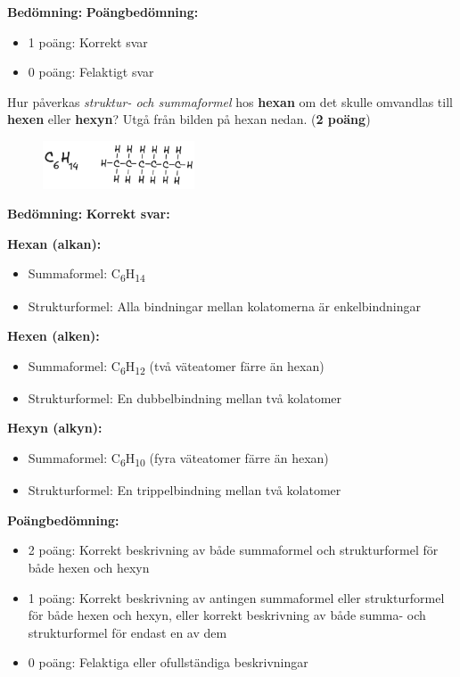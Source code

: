 \documentclass[12pt]{exam}
\newenvironment{answer}
  {\begin{framed}\color{blue}\textbf{Bedömning:} }
  {\end{framed}}
\begin{document}
\begin{questions}
\begin{answer}
\textbf{Poängbedömning:}
\begin{itemize}
  \item 1 poäng: Korrekt svar
  \item 0 poäng: Felaktigt svar
\end{itemize}
\end{answer}
\vspace{5mm}

\question Hur påverkas \textit{struktur- och summaformel} hos \textbf{hexan} om det skulle omvandlas till \textbf{hexen} eller \textbf{hexyn}? Utgå från bilden på hexan nedan. (\textbf{2 poäng})

\begin{figure}[h]
  \centering
  \includegraphics[width=0.4\textwidth]{hexan.png}
\end{figure}
\vspace{5mm}

\begin{answer}
\textbf{Korrekt svar:}

\textbf{Hexan (alkan):}
\begin{itemize}
  \item Summaformel: C\textsubscript{6}H\textsubscript{14}
  \item Strukturformel: Alla bindningar mellan kolatomerna är enkelbindningar
\end{itemize}

\textbf{Hexen (alken):}
\begin{itemize}
  \item Summaformel: C\textsubscript{6}H\textsubscript{12} (två väteatomer färre än hexan)
  \item Strukturformel: En dubbelbindning mellan två kolatomer
\end{itemize}

\textbf{Hexyn (alkyn):}
\begin{itemize}
  \item Summaformel: C\textsubscript{6}H\textsubscript{10} (fyra väteatomer färre än hexan)
  \item Strukturformel: En trippelbindning mellan två kolatomer
\end{itemize}

\textbf{Poängbedömning:}
\begin{itemize}
  \item 2 poäng: Korrekt beskrivning av både summaformel och strukturformel för både hexen och hexyn
  \item 1 poäng: Korrekt beskrivning av antingen summaformel eller strukturformel för både hexen och hexyn, eller korrekt beskrivning av både summa- och strukturformel för endast en av dem
  \item 0 poäng: Felaktiga eller ofullständiga beskrivningar
\end{itemize}
\end{answer}
\break


\end{questions}
\end{document}
